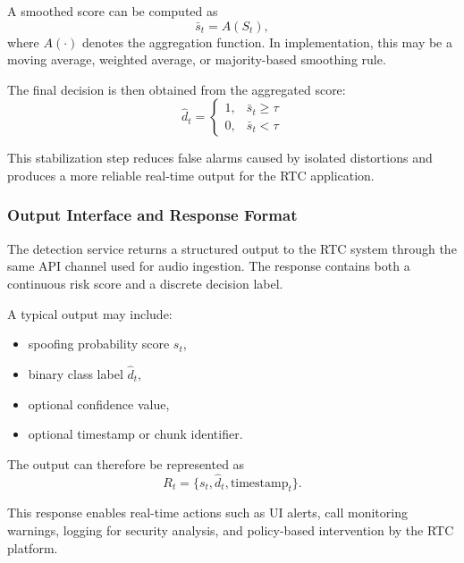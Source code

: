 A smoothed score can be computed as
\begin{equation}
\bar{s}_t = A(S_t),
\end{equation}
where \(A(\cdot)\) denotes the aggregation function. In implementation, this may be a moving average, weighted average, or majority-based smoothing rule.

The final decision is then obtained from the aggregated score:
\begin{equation}
\hat{d}_t =
\begin{cases}
1, & \bar{s}_t \geq \tau \\
0, & \bar{s}_t < \tau
\end{cases}
\end{equation}

This stabilization step reduces false alarms caused by isolated distortions and produces a more reliable real-time output for the RTC application.

\subsubsection{Output Interface and Response Format}

The detection service returns a structured output to the RTC system through the same API channel used for audio ingestion. The response contains both a continuous risk score and a discrete decision label.

A typical output may include:
\begin{itemize}
    \item spoofing probability score \(s_t\),
    \item binary class label \(\hat{d}_t\),
    \item optional confidence value,
    \item optional timestamp or chunk identifier.
\end{itemize}

The output can therefore be represented as
\begin{equation}
R_t = \{s_t, \hat{d}_t, \text{timestamp}_t\}.
\end{equation}

This response enables real-time actions such as UI alerts, call monitoring warnings, logging for security analysis, and policy-based intervention by the RTC platform.
